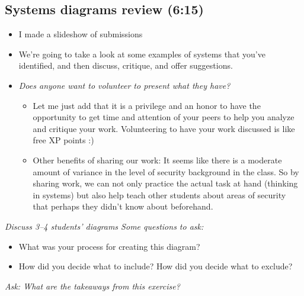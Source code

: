 \documentclass[11pt]{article}
\begin{document}
\subsection{Systems diagrams review (6:15)}

\begin{itemize}
    \item I made a slideshow of submissions
    \item We're going to take a look at some examples of systems that you've identified, and then discuss, critique, and offer suggestions.
   \item {\it Does anyone want to volunteer to present what they have?}
    \begin{itemize}
        \item Let me just add that it is a privilege and an honor to have the opportunity to get time and attention of your peers to help you analyze and critique your work. Volunteering to have your work discussed is like free XP points :) 
        \item Other benefits of sharing our work: It seems like there is a moderate amount of variance in the level of security background in the class. So by sharing work, we can not only practice the actual task at hand (thinking in systems) but also help teach other students about areas of security that perhaps they didn't know about beforehand.
    \end{itemize}
\end{itemize}

{\it Discuss 3--4 students' diagrams Some questions to ask:}
{\it 
\begin{itemize}
    \item What was your process for creating this diagram?
    \item How did you decide what to include? How did you decide what to exclude?
\end{itemize}
}

{\it Ask: What are the takeaways from this exercise?}
\end{document}
